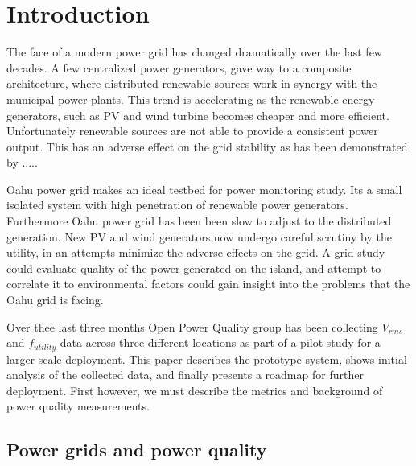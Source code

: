 
\chapter{Introduction}

	The face of a modern power grid has changed dramatically over the last
few decades. A few centralized power generators, gave way to a composite architecture,
where distributed renewable sources work in synergy with the municipal power plants.
This trend is accelerating as the renewable energy generators, such as PV and wind 
turbine becomes cheaper and more efficient. Unfortunately renewable sources are not
able to provide a consistent power output. This has an adverse effect on the grid
stability as has been demonstrated by ..... 

	Oahu power grid makes an ideal testbed for power monitoring study. Its a small isolated system
with high penetration of renewable power generators. Furthermore Oahu power grid
has been been slow to adjust to the distributed generation. New PV and wind generators
now undergo careful scrutiny by the utility, in an attempts minimize the adverse effects 
on the grid. A grid study could evaluate quality of the power generated on the island,
and attempt to correlate it to environmental factors could gain insight into the problems 
that the Oahu grid is facing.

	Over thee last three months Open Power Quality group has been collecting $V_{rms}$ and
$f_{utility}$ data across three different locations as part of a pilot study for a larger scale deployment.
This paper describes the prototype system, shows initial analysis of the collected data, and finally presents a roadmap for further deployment.
First however, we must describe the metrics and background of power quality measurements.
\section{Power grids and power quality}

